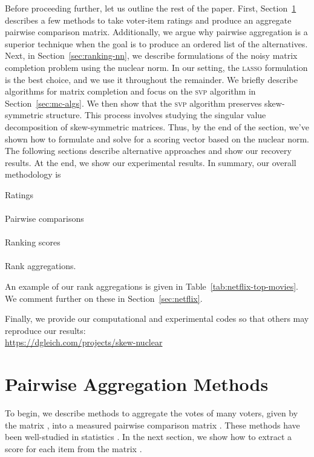 \documentclass{sig-alternate}
\renewcommand{\cite}{\citep}
\newcommand{\algo}[1]{\textsc{\lowercase{#1}}}
\begin{document}
Before proceeding further, let us outline the rest of the paper.
First, Section~\ref{sec:pairwise} describes a few 
methods to take voter-item ratings and produce an aggregate 
pairwise comparison matrix.  Additionally, we argue 
why pairwise aggregation is
a superior technique when the goal is to produce
an ordered list of the alternatives.  
Next, in Section~\ref{sec:ranking-nn}, we describe  
formulations of the noisy matrix completion problem 
using the nuclear norm.
In our setting, the 
\algo{lasso} formulation is the best choice, and we use
it throughout the remainder.  We 
briefly describe algorithms for matrix completion and focus
on the \algo{svp} algorithm  \cite{Jain-2010-SVP} 
in Section~\ref{sec:mc-algs}.
We then show that the \algo{svp} algorithm preserves skew-symmetric structure.
This process
involves studying the singular value decomposition of skew-symmetric
matrices.  Thus, by the end of the section, we've shown how to
formulate and solve for a scoring vector based on the nuclear norm.
The following sections describe alternative approaches and show our
recovery results.  At the end, we show our experimental results.
In summary, our overall methodology is 
\begin{center}
Ratings \rlap{()} \\
 \rlap{(\S \ref{sec:pairwise})}\\
 Pairwise comparisons \rlap{()}\\
 \rlap{(\S \ref{sec:ranking-nn})}\\
Ranking scores \rlap{()} \\
  \\
Rank aggregations.
\end{center}
An example of our rank aggregations 
is given in Table~\ref{tab:netflix-top-movies}.  We comment
further on these in Section~\ref{sec:netflix}.

Finally, we provide our computational and experimental
codes so that others may reproduce our results:\\
\url{https://dgleich.com/projects/skew-nuclear}



\section{Pairwise Aggregation Methods}
\label{sec:pairwise}

To begin, we describe methods to aggregate the votes
of many voters, given by the matrix , 
into a measured pairwise comparison matrix .  
These methods have been well-studied in statistics
\cite{david1988-paired}.
In the next
section, we show how to extract a score for each item from the 
matrix .
\end{document}
